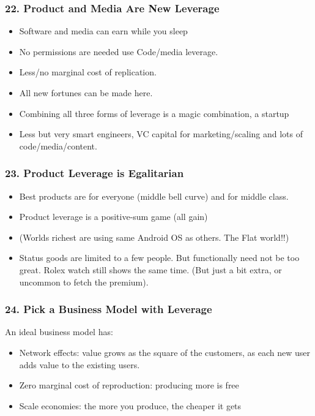 \begin{frame}[fragile]
\frametitle{22. Product and Media Are New Leverage}
\begin{itemize}
\item Software and media can earn while you sleep
\item No permissions are needed use Code/media leverage.
\item Less/no marginal cost of replication.
\item All new fortunes can be made here.
\item Combining all three forms of leverage is a magic combination, a startup
\item Less but very smart engineers, VC capital for marketing/scaling and lots of code/media/content.
\end{itemize}
\end{frame}

\begin{frame}[fragile]
\frametitle{23. Product Leverage is Egalitarian}
\begin{itemize}
\item Best products are for everyone (middle bell curve) and for middle class.
\item Product leverage is a positive-sum game (all gain)
\item (Worlds richest are using same Android OS as others. The Flat world!!)
\item Status goods are limited to a few people. But functionally need not be too great. Rolex watch still shows the same time. (But just a bit extra, or uncommon to fetch the premium).
\end{itemize}
\end{frame}

\begin{frame}[fragile]
\frametitle{24. Pick a Business Model with Leverage}
An ideal business model has:
\begin{itemize}
\item Network effects: value grows as the square of the customers, as each new user adds value to the existing users.
\item Zero marginal cost of reproduction: producing more is free
\item Scale economies: the more you produce, the cheaper it gets
\end{itemize}
\end{frame}

